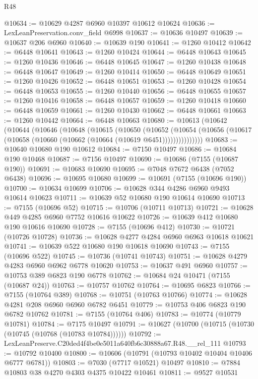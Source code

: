 \begin{lexlean}{R48}
\begin{coremodule}
@10634 := @10629 @4287 @6960 @10397 @10612 @10624
@10636 := LexLeanPreservation.conv_field @6998
@10637 := @10636 @10497
@10639 := @10637 @206 @6960
@10640 := @10639 @190
@10641 := @1260 @10412
@10642 := @6448 @10641
@10643 := @1260 @10424
@10644 := @6448 @10643
@10645 := @1260 @10436
@10646 := @6448 @10645
@10647 := @1260 @10438
@10648 := @6448 @10647
@10649 := @1260 @10414
@10650 := @6448 @10649
@10651 := @1260 @10426
@10652 := @6448 @10651
@10653 := @1260 @10428
@10654 := @6448 @10653
@10655 := @1260 @10440
@10656 := @6448 @10655
@10657 := @1260 @10416
@10658 := @6448 @10657
@10659 := @1260 @10418
@10660 := @6448 @10659
@10661 := @1260 @10430
@10662 := @6448 @10661
@10663 := @1260 @10442
@10664 := @6448 @10663
@10680 := @10613
    (@10642
      (@10644
        (@10646
          (@10648
            (@10615
              (@10650
                (@10652
                  (@10654
                    (@10656 (@10617 (@10658 (@10660 (@10662 (@10664 (@10619 @6451)))))))))))))))
@10683 := @10640 @10680 @190 @10612
@10684 := @7150 @10497
@10686 := @10684 @190 @10468
@10687 := @7156 @10497
@10690 := @10686 (@7155 (@10687 @190))
@10691 := @10683 @10690
@10695 := @7048 @7672 @6438 (@7052 @6438)
@10696 := @10695 @10680
@10699 := @10691 (@7155 (@10696 @190))
@10700 := @10634 @10699
@10706 := @10628 @344 @4286 @6960 @9493 @10614 @10623
@10711 := @10639 @52 @10680 @190 @10614 @10690
@10713 := @7155 (@10696 @52)
@10715 := @10706 (@10711 @10713)
@10721 := @10628 @449 @4285 @6960 @7752 @10616 @10622
@10726 := @10639 @412 @10680 @190 @10616 @10690
@10728 := @7155 (@10696 @412)
@10730 := @10721 (@10726 @10728)
@10736 := @10628 @4277 @4284 @6960 @6963 @10618 @10621
@10741 := @10639 @522 @10680 @190 @10618 @10690
@10743 := @7155 (@10696 @522)
@10745 := @10736 (@10741 @10743)
@10751 := @10628 @4279 @4283 @6960 @6962 @6778 @10620
@10753 := @10637 @491 @6960
@10757 := @10753 @389 @6823 @190 @6778
@10762 := @10684 @24 @10471 (@7155 (@10687 @24))
@10763 := @10757 @10762
@10764 := @10695 @6823
@10766 := @7155 (@10764 @389)
@10768 := @10751 (@10763 @10766)
@10774 := @10628 @4281 @208 @6960 @6960 @6782 @6451
@10779 := @10753 @406 @6823 @190 @6782 @10762
@10781 := @7155 (@10764 @406)
@10783 := @10774 (@10779 @10781)
@10784 := @7175 @10497
@10791 := @10627 (@10700 (@10715 (@10730 (@10745 (@10768 (@10783 @10784))))))
@10792 := LexLeanPreserve.C20ded4f4be0e5011a640fb6c30888a67.R48.__rel_111
@10793 := @10792 @10400
@10800 := @10606 (@10791 (@10793 @10402 @10404 @10406 @6777 @6781))
@10803 := @7030 (@7717 @10521) @10497
@10810 := @7884 @10803 @38 @4270 @4303 @4375 @10422 @10461
@10811 := @9527 @10531

\end{coremodule}
\end{lexlean}
